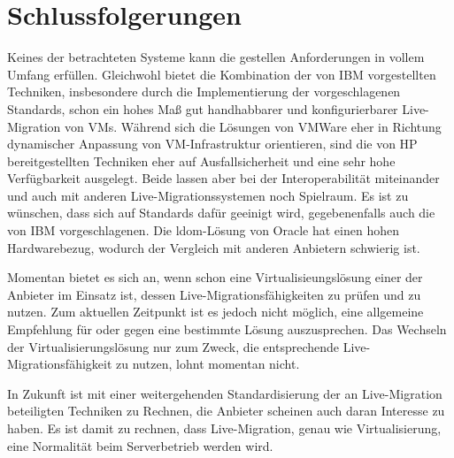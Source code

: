 \section{Schlussfolgerungen}

Keines der betrachteten Systeme kann die gestellen Anforderungen in
vollem Umfang erfüllen. Gleichwohl bietet die Kombination der von IBM
vorgestellten Techniken, insbesondere durch die Implementierung der
vorgeschlagenen Standards, schon ein hohes Maß gut handhabbarer und
konfigurierbarer Live-Migration von \acp{VM}. Während sich die
Lösungen von VMWare eher in Richtung dynamischer Anpassung von
\ac{VM}-Infrastruktur orientieren, sind die von HP bereitgestellten
Techniken eher auf Ausfallsicherheit und eine sehr hohe Verfügbarkeit
ausgelegt. Beide lassen aber bei der Interoperabilität miteinander und
auch mit anderen Live-Migrationssystemen noch Spielraum. Es
ist zu wünschen, dass sich auf Standards dafür geeinigt wird,
gegebenenfalls auch die von IBM vorgeschlagenen. Die \ac{ldom}-Lösung von
Oracle hat einen hohen Hardwarebezug, wodurch der Vergleich mit
anderen Anbietern schwierig ist. 

Momentan bietet es sich an, wenn schon eine Virtualisieungslösung
einer der Anbieter im Einsatz ist, dessen Live-Migrationsfähigkeiten
zu prüfen und zu nutzen. Zum aktuellen Zeitpunkt ist es jedoch nicht
möglich, eine allgemeine Empfehlung für oder gegen eine bestimmte
Lösung auszusprechen. Das Wechseln der Virtualisierungslösung nur zum
Zweck, die entsprechende Live-Migrationsfähigkeit zu nutzen, lohnt
momentan nicht.

In Zukunft ist mit einer weitergehenden Standardisierung der an
Live-Migration beteiligten Techniken zu Rechnen, die Anbieter scheinen
auch daran Interesse zu haben. Es ist damit zu rechnen, dass
Live-Migration, genau wie Virtualisierung, eine Normalität beim
Serverbetrieb werden wird.



